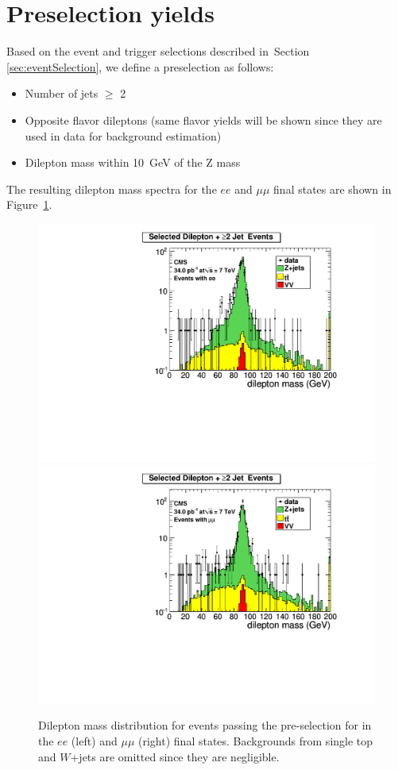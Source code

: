 \section{Preselection yields}
\label{sec:yields}

Based on the event and trigger selections described in~Section \ref{sec:eventSelection}, 
we define a preselection as follows:
\begin{itemize}
\item Number of jets $\geq$ 2
\item Opposite flavor dileptons (same flavor yields will be shown since they are used in data for \ttbar background estimation)
\item Dilepton mass within 10~GeV of the Z mass
\end{itemize}
The resulting dilepton mass spectra for the $ee$ and $\mu\mu$ final states are shown in Figure~\ref{fig:dilmass}.


\begin{figure}[hbt]
\begin{center}
\includegraphics[width=0.48\linewidth]{plots/hdilmass_ee_allj.pdf}
\includegraphics[width=0.48\linewidth]{plots/hdilmass_mm_allj.pdf}
\caption{\label{fig:dilmass}\protect Dilepton mass distribution for events passing the pre-selection for \lumi
  in the $ee$ (left) and $\mu\mu$ (right) final states. Backgrounds from single top and $W$+jets are omitted
  since they are negligible.}
\end{center}
\end{figure}


